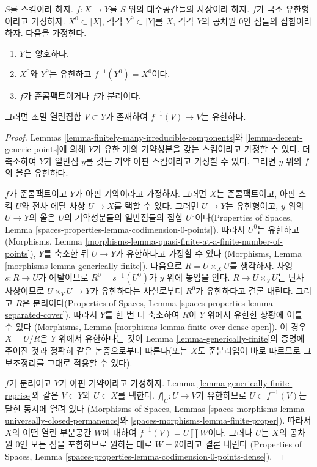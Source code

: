 \begin{lemma}
\label{lemma-finite-over-dense-open}
$S$를 스킴이라 하자. $f : X \to Y$를 $S$ 위의 대수공간들의
사상이라 하자. $f$가 국소 유한형이라고 가정하자.
$X^0 \subset |X|$, 각각 $Y^0 \subset |Y|$를 $X$, 각각 $Y$의
공차원 $0$인 점들의 집합이라 하자. 다음을 가정한다.
\begin{enumerate}
\item $Y$는 양호하다.
\item $X^0$와 $Y^0$는 유한하고 $f^{-1}(Y^0) = X^0$이다.
\item $f$가 준콤팩트이거나 $f$가 분리이다.
\end{enumerate}
그러면 조밀 열린집합 $V \subset Y$가 존재하여
$f^{-1}(V) \to V$는 유한하다.
\end{lemma}

\begin{proof}
Lemmas \ref{lemma-finitely-many-irreducible-components}와
\ref{lemma-decent-generic-points}에 의해 $Y$가 유한 개의 기약성분을
갖는 스킴이라고 가정할 수 있다. 더 축소하여 $Y$가 일반점 $y$를
갖는 기약 아핀 스킴이라고 가정할 수 있다. 그러면 $y$ 위의 $f$의
올은 유한하다.

\medskip\noindent
$f$가 준콤팩트이고 $Y$가 아핀 기약이라고 가정하자. 그러면 $X$는
준콤팩트이고, 아핀 스킴 $U$와 전사 에탈 사상 $U \to X$를 택할 수
있다. 그러면 $U \to Y$는 유한형이고, $y$ 위의 $U \to Y$의 올은
$U$의 기약성분들의 일반점들의 집합 $U^0$이다(Properties of Spaces,
Lemma \ref{spaces-properties-lemma-codimension-0-points}).
따라서 $U^0$는 유한하고(Morphisms, Lemma
\ref{morphisms-lemma-quasi-finite-at-a-finite-number-of-points}),
$Y$를 축소한 뒤 $U \to Y$가 유한하다고 가정할 수 있다
(Morphisms, Lemma \ref{morphisms-lemma-generically-finite}).
다음으로 $R = U \times_X U$를 생각하자. 사영 $s : R \to U$가
에탈이므로 $R^0 = s^{-1}(U^0)$가 $y$ 위에 놓임을 안다.
$R \to U \times_Y U$는 단사 사상이므로 $U \times_Y U \to Y$가
유한하다는 사실로부터 $R^0$가 유한하다고 결론 내린다.
그리고 $R$은 분리이다(Properties of Spaces, Lemma
\ref{spaces-properties-lemma-separated-cover}). 따라서 $Y$를 한 번
더 축소하여 $R$이 $Y$ 위에서 유한한 상황에 이를 수 있다
(Morphisms, Lemma \ref{morphisms-lemma-finite-over-dense-open}).
이 경우 $X = U/R$은 $Y$ 위에서 유한하다는 것이 Lemma
\ref{lemma-generically-finite}의 증명에 주어진 것과 정확히 같은
논증으로부터 따른다(또는 $X$도 준분리임이 바로 따르므로 그 보조정리를
그대로 적용할 수 있다).

\medskip\noindent
$f$가 분리이고 $Y$가 아핀 기약이라고 가정하자. Lemma
\ref{lemma-generically-finite-reprise}와 같은 $V \subset Y$와
$U \subset X$를 택한다. $f|_U : U \to V$가 유한하므로
$U \subset f^{-1}(V)$는 닫힌 동시에 열려 있다
(Morphisms of Spaces, Lemmas
\ref{spaces-morphisms-lemma-universally-closed-permanence}와
\ref{spaces-morphisms-lemma-finite-proper}).
따라서 $X$의 어떤 열린 부분공간 $W$에 대하여
$f^{-1}(V) = U \amalg W$이다. 그러나 $U$는 $X$의 공차원 $0$인
모든 점을 포함하므로 원하는 대로 $W = \emptyset$이라고 결론 내린다
(Properties of Spaces, Lemma
\ref{spaces-properties-lemma-codimension-0-points-dense}).
\end{proof}

